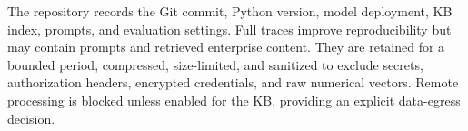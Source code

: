 The repository records the Git commit, Python version, model deployment, KB
index, prompts, and evaluation settings. Full traces improve reproducibility
but may contain prompts and retrieved enterprise content. They are retained for
a bounded period, compressed, size-limited, and sanitized to exclude secrets,
authorization headers, encrypted credentials, and raw numerical vectors.
Remote processing is blocked unless enabled for the KB, providing an explicit
data-egress decision.
